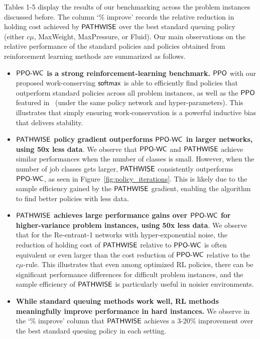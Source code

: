 Tables 1-5 display the results of our benchmarking across the problem instances discussed before. The column `\% improve' records the relative reduction in holding cost achieved by $\mathsf{PATHWISE}$ over the best standard queuing policy (either $c\mu$, MaxWeight, MaxPressure, or Fluid). Our main observations on the relative performance of the standard policies and policies obtained from reinforcement learning methods are summarized as follows.
\begin{itemize}[itemsep=0pt]
    \item {\bf $\mathsf{PPO}\text{-}\mathsf{WC}$ is a strong reinforcement-learning benchmark.} $\mathsf{PPO}$ with our proposed work-conserving $\mathop{\mathsf{softmax}}$ is able to efficiently find policies that outperform standard policies across all problem instances, as well as the $\mathsf{PPO}$ featured in~\cite{dai2022queueing} (under the same policy network and hyper-parameters). This illustrates that simply ensuring work-conservation is a powerful inductive bias that delivers stability.
    \item {\bf $\mathsf{PATHWISE}$ policy gradient outperforms $\mathsf{PPO}\text{-}\mathsf{WC}$ in larger networks, using 50x less data}. We observe that $\mathsf{PPO}\text{-}\mathsf{WC}$ and $\mathsf{PATHWISE}$ achieve similar performances when the number of classes is small. However, when the number of job classes gets larger, $\mathsf{PATHWISE}$ consistently outperforms $\mathsf{PPO}\text{-}\mathsf{WC}$, as seen in Figure~\ref{fig:policy_iterations}. This is likely due to the 
    sample efficiency gained by the $\mathsf{PATHWISE}$ gradient, enabling the algorithm to find better policies with less data.
    \item {\bf $\mathsf{PATHWISE}$ achieves large performance gains over  $\mathsf{PPO}\text{-}\mathsf{WC}$ for higher-variance problem instances, using 50x less data}. We observe that for the Re-entrant-1 networks with hyper-exponential noise, the reduction of holding cost of $\mathsf{PATHWISE}$ relative to $\mathsf{PPO}\text{-}\mathsf{WC}$ is often equivalent or even larger than the cost reduction of $\mathsf{PPO}\text{-}\mathsf{WC}$ relative to the $c\mu$-rule. This illustrates that even among optimized RL policies, there can be significant performance differences for difficult problem instances, and the sample efficiency of $\mathsf{PATHWISE}$ is particularly useful in noisier environments.
    \item {\bf While standard queuing methods work well, RL methods meaningfully improve performance in hard instances.} We observe in the `\% improve' column that $\mathsf{PATHWISE}$ achieves a 3-20\% improvement over the best standard queuing policy in each setting.
\end{itemize}



